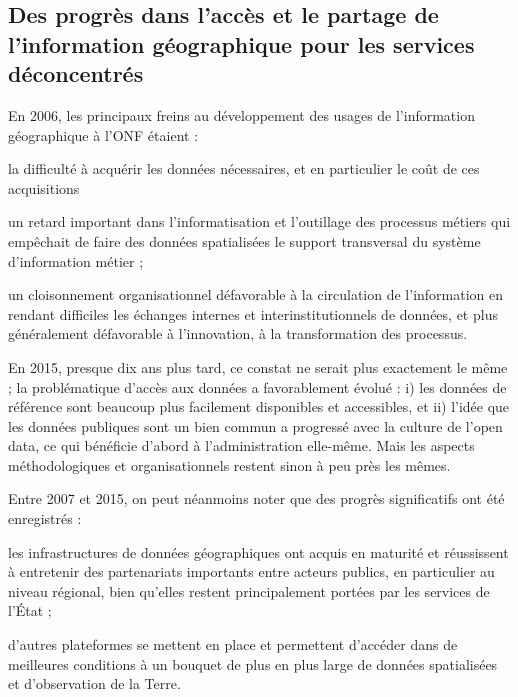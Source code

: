 \subsection
{Des progrès dans l'accès et le partage de l'information géographique pour les
services déconcentrés}


En 2006, les principaux freins au développement
des usages de l'information géographique à l'ONF étaient :

\startitemize

\item la difficulté à acquérir les données nécessaires,
      et en particulier le coût de ces acquisitions

\item un retard important dans l'informatisation et l'outillage
      des processus métiers qui empêchait de faire
      des données spatialisées le support transversal
      du système d'information métier ;

\item un cloisonnement organisationnel défavorable
      à la circulation de l'information en rendant difficiles
      les échanges internes et interinstitutionnels de
      données, et plus généralement défavorable à l'innovation, à la transformation des processus.

\stopitemize

En 2015, presque dix ans plus tard, ce constat ne serait plus exactement le
même ; la problématique d'accès aux données a favorablement évolué :
i) les données de référence sont beaucoup plus facilement disponibles et
accessibles, et ii) l'idée que les données publiques sont un bien commun a
progressé avec la culture de l'open data, ce qui bénéficie d'abord à
l'administration elle-même. Mais les aspects méthodologiques et
organisationnels restent sinon à peu près les mêmes.

Entre 2007 et 2015, on peut néanmoins noter que des progrès significatifs ont
été enregistrés :

\startitemize

\item les infrastructures de données géographiques ont acquis en maturité et
réussissent à entretenir des partenariats importants entre acteurs publics, en
particulier au niveau régional, bien qu'elles restent principalement portées
par les services de l'État ;

\item d'autres plateformes se mettent en place et permettent d'accéder dans de
meilleures conditions à un bouquet de plus en plus large de données
spatialisées et d'observation de la Terre.

